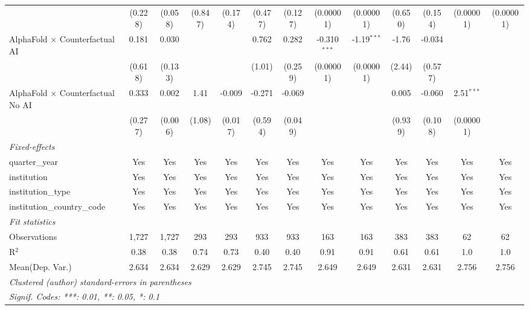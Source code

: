 \begin{tabular}{lcccccccccccc}
                                            & (0.228) & (0.058) & (0.847) & (0.174) & (0.477) & (0.127) & (0.00001)      & (0.00001)      & (0.650) & (0.154) & (0.00001)      & (0.00001)\\   
   AlphaFold $\times$ Counterfactual AI     & 0.181   & 0.030   &         &         & 0.762   & 0.282   & -0.310$^{***}$ & -1.19$^{***}$  & -1.76   & -0.034  &                &   \\   
                                            & (0.618) & (0.133) &         &         & (1.01)  & (0.259) & (0.00001)      & (0.00001)      & (2.44)  & (0.577) &                &   \\   
   AlphaFold $\times$ Counterfactual No AI  & 0.333   & 0.002   & 1.41    & -0.009  & -0.271  & -0.069  &                &                & 0.005   & -0.060  & 2.51$^{***}$   &   \\   
                                            & (0.277) & (0.006) & (1.08)  & (0.017) & (0.594) & (0.049) &                &                & (0.939) & (0.108) & (0.00001)      &   \\   
   \midrule
   \emph{Fixed-effects}\\
   quarter\_year                            & Yes     & Yes     & Yes     & Yes     & Yes     & Yes     & Yes            & Yes            & Yes     & Yes     & Yes            & Yes\\  
   institution                              & Yes     & Yes     & Yes     & Yes     & Yes     & Yes     & Yes            & Yes            & Yes     & Yes     & Yes            & Yes\\  
   institution\_type                        & Yes     & Yes     & Yes     & Yes     & Yes     & Yes     & Yes            & Yes            & Yes     & Yes     & Yes            & Yes\\  
   institution\_country\_code               & Yes     & Yes     & Yes     & Yes     & Yes     & Yes     & Yes            & Yes            & Yes     & Yes     & Yes            & Yes\\  
   \midrule
   \emph{Fit statistics}\\
   Observations                             & 1,727   & 1,727   & 293     & 293     & 933     & 933     & 163            & 163            & 383     & 383     & 62             & 62\\  
   R$^2$                                    & 0.38    & 0.38    & 0.74    & 0.73    & 0.40    & 0.40    & 0.91           & 0.91           & 0.61    & 0.61    & 1.0            & 1.0\\  
Mean(Dep. Var.) & 2.634 & 2.634 & 2.629 & 2.629 & 2.745 & 2.745 & 2.649 & 2.649 & 2.631 & 2.631 & 2.756 & 2.756 \\
   \midrule \midrule
   \multicolumn{13}{l}{\emph{Clustered (author) standard-errors in parentheses}}\\
   \multicolumn{13}{l}{\emph{Signif. Codes: ***: 0.01, **: 0.05, *: 0.1}}\\
\end{tabular}
\par\endgroup
